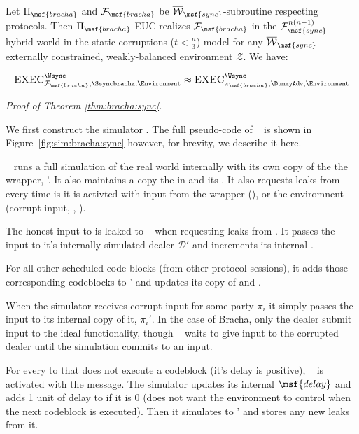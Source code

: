 \begin{theorem}\label{thm:bracha:sync}
Let $\Pi_{\msf{bracha}}$ and $\mathcal{F}_{\msf{bracha}}$ be $\overline{\mathcal{W}}_{\msf{sync}}$-subroutine respecting protocols. 
Then $\Pi_{\msf{bracha}}$ EUC-realizes $\mathcal{F}_{\msf{bracha}}$ in the $\mathcal{F}^{n(n-1)}_{\msf{sync}}$-hybrid world in the static corruptions ($t < \frac{n}{3}$) model for any $\overline{\mathcal{W}}_{\msf{sync}}$-externally constrained, weakly-balanced environment $\mathcal{Z}$. We have:

$$\textsc{EXEC}^{\Wsync}_{\mathcal{F}_{\msf{bracha}}, \Ssyncbracha, \Environment} \approx \textsc{EXEC}^{\Wsync}_{\pi_{\msf{bracha}}, \DummyAdv, \Environment}$$
\end{theorem}

\textit{Proof of Theorem \ref{thm:bracha:sync}.}

We first construct the simulator \Ssyncbracha. 
The full pseudo-code of \Ssyncbracha~ is shown in Figure~\ref{fig:sim:bracha:sync} however, for brevity, we describe it here.

\Ssyncbracha~ runs a full simulation of the real world internally with its own copy of the the wrapper, \Wsync'. It also maintains a copy the  in \Wsync and its . 
It also requests leaks from \Wsync every time is it is activted with input from the wrapper (\Advance), or the enviromnent (corrupt input, \Delay, \Exec).

The honest input to \Fbracha is leaked to \Ssyncbracha~ when requesting leaks from \Wsync. 
It passes the input to it's internally simulated dealer $\mathcal{D}'$ and increments its internal .

For all other scheduled code blocks (from other protocol sessions), it adds those corresponding codeblocks to \Wsync' and updates its copy of  and .

 When the simulator receives corrupt input for some party $\pi_i$ it simply passes the input to its internal copy of it, $\pi_i'$. In the case of Bracha, only the dealer submit input to the ideal functionality, though \Ssyncbracha~ waits to give input to the corrupted dealer until the simulation commits to an input.

For every  to \Wsync that does not execute a codeblock (it's delay is positive), \Ssyncbracha~ is activated with the  message.
The simulator updates its internal $\msf{delay}$ and adds 1 unit of delay to \Wsync if it is 0 (does not want the environment to control when the next codeblock is executed).
Then it simulates  to \Wsync' and stores any new leaks from it.

